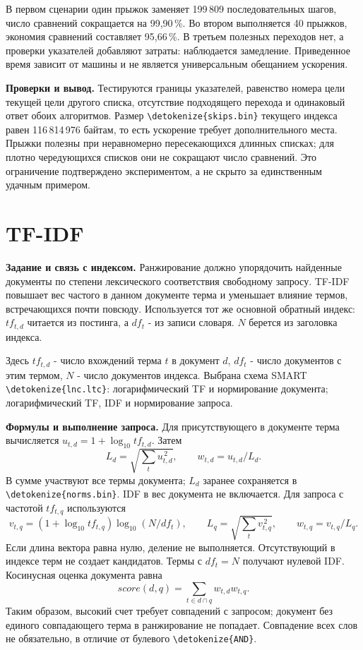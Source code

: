 \documentclass[pdf,unicode,12pt,a4paper,oneside,fleqn]{article}
\newcommand{\labsection}[2]{\par\Needspace{9\baselineskip}\setcounter{section}{\numexpr#1-1\relax}\section{#2}}
\newcommand{\partlabel}[1]{\par\Needspace{4\baselineskip}\medskip\textbf{#1.}\quad}
\DeclareRobustCommand{\code}[1]{\expandafter\nolinkurl\expandafter{\detokenize{#1}}}
\begin{document}
В первом сценарии один прыжок заменяет 199\,809 последовательных шагов,
число сравнений сокращается на 99,90\,\%. Во втором выполняется 40 прыжков,
экономия сравнений составляет 95,66\,\%. В третьем полезных переходов нет,
а проверки указателей добавляют затраты: наблюдается замедление. Приведенное
время зависит от машины и не является универсальным обещанием ускорения.

\partlabel{Проверки и вывод}
Тестируются границы указателей, равенство номера цели текущей цели другого
списка, отсутствие подходящего перехода и одинаковый ответ обоих алгоритмов.
Размер \code{skips.bin} текущего индекса равен 116\,814\,976 байтам,
то есть ускорение требует дополнительного места. Прыжки полезны при
неравномерно пересекающихся длинных списках; для плотно чередующихся списков
они не сокращают число сравнений. Это ограничение подтверждено экспериментом,
а не скрыто за единственным удачным примером.

\labsection{13}{TF-IDF}

\partlabel{Задание и связь с индексом}
Ранжирование должно упорядочить найденные документы по степени лексического
соответствия свободному запросу. TF-IDF повышает вес частого в данном документе
терма и уменьшает влияние термов, встречающихся почти повсюду. Используется
тот же основной обратный индекс: $tf_{t,d}$ читается из постинга, а
$df_t$ - из записи словаря. $N$ берется из заголовка индекса.

Здесь $tf_{t,d}$ - число вхождений терма $t$ в документ $d$, $df_t$ - число
документов с этим термом, $N$ - число документов индекса. Выбрана схема
SMART \code{lnc.ltc}: логарифмический TF и нормирование документа;
логарифмический TF, IDF и нормирование запроса.

\partlabel{Формулы и выполнение запроса}
Для присутствующего в документе терма вычисляется
$u_{t,d}=1+\log_{10}tf_{t,d}$. Затем
\[
 L_d=\sqrt{\sum_t u_{t,d}^{\,2}},\qquad w_{t,d}=u_{t,d}/L_d.
\]
В сумме участвуют все термы документа; $L_d$ заранее сохраняется в
\code{norms.bin}. IDF в вес документа не включается. Для запроса с частотой
$tf_{t,q}$ используются
\[
 v_{t,q}=(1+\log_{10}tf_{t,q})\log_{10}(N/df_t),\qquad
 L_q=\sqrt{\sum_t v_{t,q}^{\,2}},\qquad w_{t,q}=v_{t,q}/L_q.
\]
Если длина вектора равна нулю, деление не выполняется. Отсутствующий
в индексе терм не создает кандидатов. Термы с $df_t=N$ получают нулевой IDF.
Косинусная оценка документа равна
\[
 score(d,q)=\sum_{t\in d\cap q}w_{t,d}w_{t,q}.
\]
Таким образом, высокий счет требует совпадений с запросом; документ без
единого совпадающего терма в ранжирование не попадает. Совпадение всех слов
не обязательно, в отличие от булевого \code{AND}.
\end{document}
